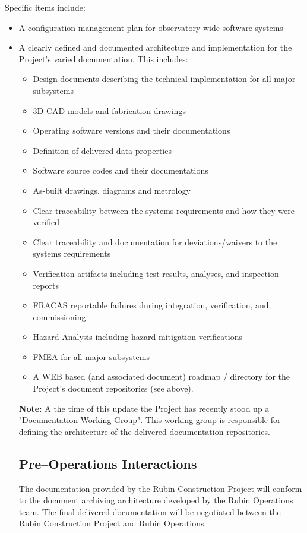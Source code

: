 Specific items include:

\begin{itemize}
	\item A configuration management plan for observatory wide software systems
	\item A clearly defined and documented architecture and implementation for the Project's varied documentation.  This includes:
	\begin{itemize}
		\item Design documents describing the technical implementation for all major subsystems
		\item 3D CAD models and fabrication drawings
		\item Operating software versions and their documentations
		\item Definition of delivered data properties
		\item Software source codes and their documentations
		\item As-built drawings, diagrams and metrology
		\item Clear traceability between the systems requirements and how they were verified
		\item Clear traceability and documentation for deviations/waivers to the systems requirements
		\item Verification artifacts including test results, analyses, and inspection reports
		\item FRACAS reportable failures during integration, verification, and commissioning
		\item Hazard Analysis including hazard mitigation verifications
		\item FMEA for all major subsystems
	\item A WEB based (and associated document) roadmap / directory for the Project's document repositories (see above).
\end{itemize}

{\bf Note:} A the time of this update the Project has recently stood up a "Documentation Working Group".  This working group is responsible for defining the architecture of the delivered documentation repositories.

\subsection{Pre--Operations Interactions}

The documentation provided by the Rubin Construction Project will conform to the document archiving architecture developed by the Rubin Operations team.  The final delivered documentation will be negotiated between the Rubin Construction Project and Rubin Operations.


\end{itemize}

